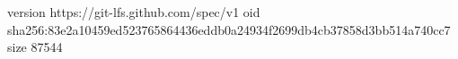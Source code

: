 version https://git-lfs.github.com/spec/v1
oid sha256:83e2a10459ed523765864436eddb0a24934f2699db4cb37858d3bb514a740cc7
size 87544
